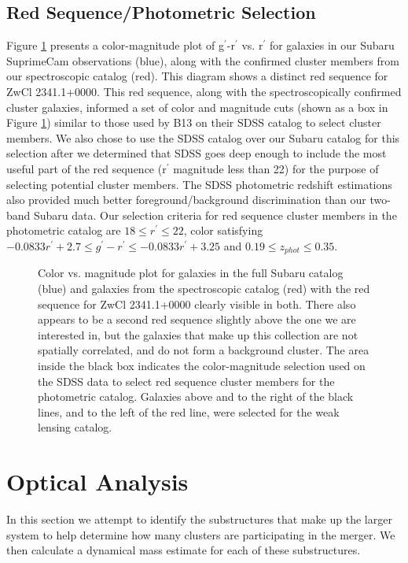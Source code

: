 \documentclass[onecolumn]{aastex}
\begin{document}
\subsection{Red Sequence/Photometric Selection}
Figure \ref{fig6} presents a color-magnitude plot of g$^{\prime}$-r$^{\prime}$ vs. r$^{\prime}$ for galaxies in our Subaru SuprimeCam observations (blue), along with the confirmed cluster members from our spectroscopic catalog (red).  This diagram shows a distinct red sequence for ZwCl 2341.1+0000.  This red sequence, along with the spectroscopically confirmed cluster galaxies, informed a set of color and magnitude cuts (shown as a box in Figure \ref{fig6}) similar to those used by B13 on their SDSS catalog to select cluster members.  We also chose to use the SDSS catalog over our Subaru catalog for this selection after we determined that SDSS goes deep enough to include the most useful part of the red sequence (r$^{\prime}$ magnitude less than 22) for the purpose of selecting potential cluster members.  The SDSS photometric redshift estimations also provided much better foreground/background discrimination than our two-band Subaru data.  Our selection criteria for red sequence cluster members in the photometric catalog are $18 \leq r^{\prime} \leq 22$, color satisfying $-0.0833r^{\prime} + 2.7 \leq g^{\prime}-r^{\prime} \leq -0.0833r^{\prime} +3.25$ and $0.19 \leq z_{phot} \leq 0.35 $.

\begin{figure} 
\caption{Color vs. magnitude plot for galaxies in the full Subaru catalog (blue) and galaxies from the spectroscopic catalog (red) with the red sequence for ZwCl 2341.1+0000 clearly visible in both.  There also appears to be a second red sequence slightly above the one we are interested in, but the galaxies that make up this collection are not spatially correlated, and do not form a background cluster.  The area inside the black box indicates the color-magnitude selection used on the SDSS data to select red sequence cluster members for the photometric catalog.  Galaxies above and to the right of the black lines, and to the left of the red line, were selected for the weak lensing catalog.\label{fig6}} 
\end{figure}

\section[]{Optical Analysis}
In this section we attempt to identify the substructures that make up the larger system to help determine how many clusters are participating in the merger.  We then calculate a dynamical mass estimate for each of these substructures.
\end{document}
